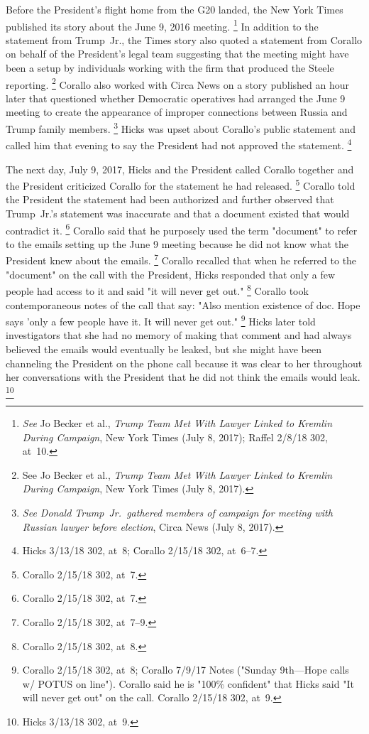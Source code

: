 {Before the President's flight home from the G20 landed, the New York Times published its story about the June 9, 2016 meeting.%
\footnote{\textit{See} Jo Becker et al., \textit{Trump Team Met With Lawyer Linked to Kremlin During Campaign}, New York Times (July 8, 2017);
Raffel 2/8/18 302, at~10.}
In addition to the statement from Trump~Jr., the Times story also quoted a statement from Corallo on behalf of the President's legal team suggesting that the meeting might have been a setup by individuals working with the firm that produced the Steele reporting.%
\footnote{See Jo Becker et al., \textit{Trump Team Met With Lawyer Linked to Kremlin During Campaign}, New York Times (July 8, 2017).}
Corallo also worked with Circa News on a story published an hour later that questioned whether Democratic operatives had arranged the June 9 meeting to create the appearance of improper connections between Russia and Trump family members.%
\footnote{\textit{See Donald Trump~Jr.\ gathered members of campaign for meeting with Russian lawyer before election}, Circa News (July 8, 2017).}
Hicks was upset about Corallo's public statement and called him that evening to say the President had not approved the statement.%
\footnote{Hicks 3/13/18 302, at~8;
Corallo 2/15/18 302, at~6--7.}

The next day, July 9, 2017, Hicks and the President called Corallo together and the President criticized Corallo for the statement he had released.%
\footnote{Corallo 2/15/18 302, at~7.}
Corallo told the President the statement had been authorized and further observed that Trump~Jr.'s statement was inaccurate and that a document existed that would contradict it.%
\footnote{Corallo 2/15/18 302, at~7.}
Corallo said that he purposely used the term "document" to refer to the emails setting up the June 9 meeting because he did not know what the President knew about the emails.%
\footnote{Corallo 2/15/18 302, at~7--9.}
Corallo recalled that when he referred to the "document" on the call with the President, Hicks responded that only a few people had access to it and said "it will never get out."%
\footnote{Corallo 2/15/18 302, at~8.}
Corallo took contemporaneous notes of the call that say:
"Also mention existence of doc.
Hope says 'only a few people have it.
It will never get out."%
\footnote{Corallo 2/15/18 302, at~8;
Corallo 7/9/17 Notes ("Sunday 9th---Hope calls w/ POTUS on line").
Corallo said he is "100\% confident" that Hicks said "It will never get out" on the call.
Corallo 2/15/18 302, at~9.}
Hicks later told investigators that she had no memory of making that comment and had always believed the emails would eventually be leaked, but she might have been channeling the President on the phone call because it was clear to her throughout her conversations with the President that he did not think the emails would leak.%
\footnote{Hicks 3/13/18 302, at~9.}

}
